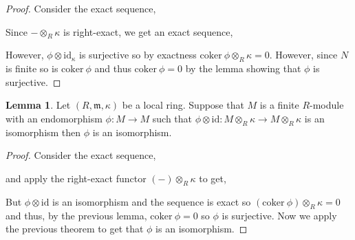 \documentclass[12pt]{extarticle}
\newcommand{\id}{\mathrm{id}}
\newcommand{\coker}[1]{\mathrm{coker}\: #1}
\theoremstyle{definition}
\newtheorem{lemma}[theorem]{Lemma}
\newcommand{\m}{\mathfrak{m}}
\begin{document}
\begin{proof}
Consider the exact sequence,
\begin{center}
\end{center}
Since $- \otimes_R \kappa$ is right-exact, we get an exact sequence,
\begin{center}
\end{center}
However, $\phi \otimes \id_\kappa$ is surjective so by exactness $\coker{\phi} \otimes_R \kappa = 0$. However, since $N$ is finite so is $\coker{\phi}$ and thus $\coker{\phi} = 0$ by the lemma showing that $\phi$ is surjective.
\end{proof}

\begin{lemma}
Let $(R, \m, \kappa)$ be a local ring. Suppose that $M$ is a finite $R$-module with an endomorphism $\phi : M \to M$ such that $\phi \otimes \id : M \otimes_R \kappa \to M \otimes_R \kappa$ is an isomorphism then $\phi$ is an isomorphism. 
\end{lemma}

\begin{proof}
Consider the exact sequence,
\begin{center}
\end{center}
and apply the right-exact functor $(-) \otimes_R \kappa$ to get,
\begin{center}
\end{center}
But $\phi \otimes \id$ is an isomorphism and the sequence is exact so $(\coker{\phi}) \otimes_R \kappa = 0$ and thus, by the previous lemma, $\coker{\phi} = 0$ so $\phi$ is surjective. Now we apply the previous theorem to get that $\phi$ is an isomorphism.
\end{proof}
\end{document}
